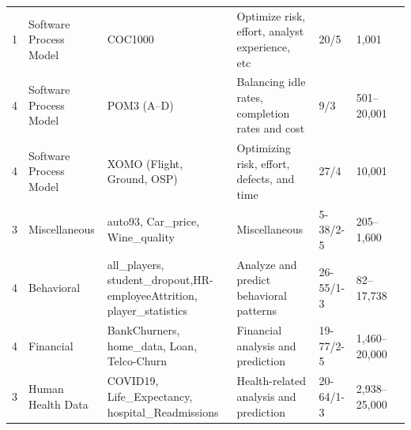 \begin{table}[!t]
\begin{adjustbox}{max width=\textwidth}
\begin{tabular}{@{}C{1.4cm}@{~}p{2.5cm}p{3.9cm}p{4.0cm}p{1.1cm}p{1.4cm}c@{}}
1           & Software Process Model           & COC1000                                                                  & Optimize risk, effort, analyst experience, etc                        & 20/5         & 1,001    &  \cite{Amiraliminimaldata, menzies2025the, senthilkumar2024can, lustosa2024learning,chen2018beyond}   \\
4           & Software Process Model           & POM3 (A–D)                                                               & Balancing idle rates, completion rates and cost                       & 9/3          & 501–20,001   & \cite{menzies2025the, senthilkumar2024can, lusstosa2025less, lustosa2024learning, lustossa2024isneak}\\
4           & Software Process Model    & XOMO (Flight, Ground, OSP)                                               & Optimizing risk, effort, defects, and time                            & 27/4         & 10,001    &  \cite{menzies2025the, senthilkumar2024can, lusstosa2025less, lustosa2024learning, lustossa2024isneak,chen2018beyond}  \\  
 3           & Miscellaneous                             & auto93, Car\_price, Wine\_quality                                        & Miscellaneous                                                         & 5-38/2-5   & 205–1,600  &  \cite{Amiraliminimaldata, menzies2025the, senthilkumar2024can, lusstosa2025less, lustosa2024learning} \\ 
4           & Behavioral                       & all\_players, student\_dropout,\newline HR-employeeAttrition, player\_statistics & Analyze and predict behavioral patterns                              & 26-55/1-3  & 82–17,738   &    \cite{nyagami_fc25_kaggle_2025, abdullah0a_student_dropout_analysis_prediction_2025, die9origephit_fifa_wc_2022_complete_2025, pavansubhasht_ibm_hr_analytics_attrition_2025}\\  
 4           & Financial                        & BankChurners, home\_data, Loan, \newline Telco-Churn                              & Financial analysis and prediction                                     & 19-77/2-5  & 1,460–20,000 &    \cite{blastchar_telco_customer_churn_2025, lorenzozoppelletto_financial_risk_for_loan_approval_2025, dansbecker_home_data_for_ml_course_2025, sakshigoyal7_credit_card_customers_2020} \\  
3           & Human Health Data                & COVID19, Life\_Expectancy, \newline hospital\_Readmissions                        & Health-related analysis and prediction                                & 20-64/1-3  & 2,938–25,000 &     \cite{dansbecker_hospital_readmissions_2025, kumarajarshi_life_expectancy_who_2025, hendratno_2022}  \\  

\end{tabular}
\end{adjustbox}
\end{table}
